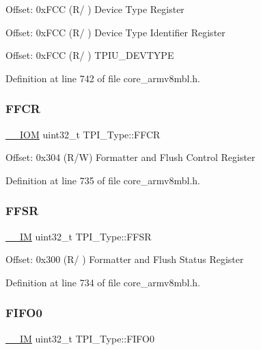 Offset\+: 0x\+F\+CC (R/ ) Device Type Register

Offset\+: 0x\+F\+CC (R/ ) Device Type Identifier Register

Offset\+: 0x\+F\+CC (R/ ) T\+P\+I\+U\+\_\+\+D\+E\+V\+T\+Y\+PE 

Definition at line 742 of file core\+\_\+armv8mbl.\+h.

\mbox{\label{struct_t_p_i___type_a3f68b6e73561b4849ebf953a894df8d2}} 
\subsubsection{\texorpdfstring{F\+F\+CR}{FFCR}}
{\footnotesize\ttfamily \hyperlink{core__sc300_8h_ab6caba5853a60a17e8e04499b52bf691}{\+\_\+\+\_\+\+I\+OM} uint32\+\_\+t T\+P\+I\+\_\+\+Type\+::\+F\+F\+CR}

Offset\+: 0x304 (R/W) Formatter and Flush Control Register 

Definition at line 735 of file core\+\_\+armv8mbl.\+h.

\mbox{\label{struct_t_p_i___type_a6c47a0b4c7ffc66093ef993d36bb441c}} 
\subsubsection{\texorpdfstring{F\+F\+SR}{FFSR}}
{\footnotesize\ttfamily \hyperlink{core__sc300_8h_a4cc1649793116d7c2d8afce7a4ffce43}{\+\_\+\+\_\+\+IM} uint32\+\_\+t T\+P\+I\+\_\+\+Type\+::\+F\+F\+SR}

Offset\+: 0x300 (R/ ) Formatter and Flush Status Register 

Definition at line 734 of file core\+\_\+armv8mbl.\+h.

\mbox{\label{struct_t_p_i___type_aa4d7b5cf39dff9f53bf7f69bc287a814}} 
\subsubsection{\texorpdfstring{F\+I\+F\+O0}{FIFO0}}
{\footnotesize\ttfamily \hyperlink{core__sc300_8h_a4cc1649793116d7c2d8afce7a4ffce43}{\+\_\+\+\_\+\+IM} uint32\+\_\+t T\+P\+I\+\_\+\+Type\+::\+F\+I\+F\+O0}

